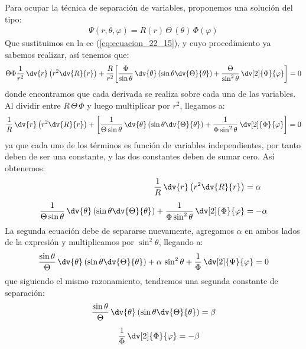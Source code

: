 Para ocupar la técnica de separación de variables, proponemos una solución del tipo:
\begin{align*}
\Psi(r, \theta, \varphi) = R(r) \, \Theta \, (\theta) \, \Phi(\varphi)
\end{align*}
Que sustituimos en la ec (\ref{eq:ecuacion_22_15}), y cuyo procedimiento ya sabemos realizar, así tenemos que:
\begin{align*}
\Theta \Phi \dfrac{1}{r^{2}} \, \dv{r} \left( r^{2} \dv{R}{r} \right) + \dfrac{R}{r^{2}} \bigg[ \dfrac{\Phi}{\sin \theta} \, \dv{\theta} \left( \sin \theta \dv{\Theta}{\theta} \right) + \dfrac{\Theta}{\sin^{2} \theta} \, \dv[2]{\Phi}{\varphi} \bigg] = 0
\end{align*}
donde encontramos que cada derivada se realiza sobre cada una de las variables. Al dividir entre $R \, \Theta \, \Phi$ y luego multiplicar por $r^{2}$, llegamos a:
\begin{align*}
\dfrac{1}{R} \, \dv{r} \left( r^{2} \dv{R}{r} \right) + \bigg[ \dfrac{1}{\Theta \sin \theta} \, \dv{\theta} \left( \sin \theta \dv{\Theta}{\theta} \right) + \dfrac{1}{\Phi \sin^{2} \theta} \, \dv[2]{\Phi}{\varphi} \bigg] = 0
\end{align*}
ya que cada uno de los términos es función de variables independientes, por tanto deben de ser una constante, y las dos constantes deben de sumar cero. Así obtenemos:
\begin{align*}
\dfrac{1}{R} \, \dv{r} \left( r^{2} \dv{R}{r} \right) &= \alpha \\[0.5em]
\dfrac{1}{\Theta \sin \theta} \, \dv{\theta} \left( \sin \theta \dv{\Theta}{\theta} \right) + \dfrac{1}{\Phi \sin^{2} \theta} \, \dv[2]{\Phi}{\varphi} &= - \alpha
\end{align*}
La segunda ecuación debe de separarse nuevamente, agregamos $\alpha$ en ambos lados de la expresión y multiplicamos por $\sin^{2} \theta$, llegando a:
\begin{align*}
\dfrac{\sin \theta}{\Theta} \, \dv{\theta} \left( \sin \theta \dv{\Theta}{\theta} \right) + \alpha \, \sin^{2} \theta +  \dfrac{1}{\Phi} \, \dv[2]{\Psi}{\varphi} = 0
\end{align*}
que siguiendo el mismo razonamiento, tendremos una segunda constante de separación:
\begin{align*}
\dfrac{\sin \theta}{\Theta} \, \dv{\theta} \left( \sin \theta \dv{\Theta}{\theta} \right) &= \beta \\[0.5em]
\dfrac{1}{\Phi} \, \dv[2]{\Phi}{\varphi} = - \beta
\end{align*}
